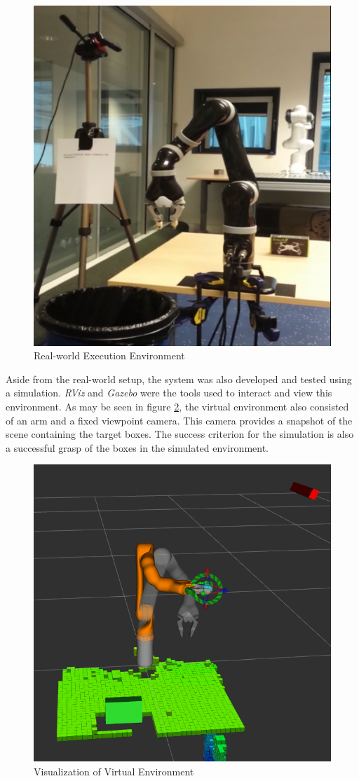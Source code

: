 \documentclass[letterpaper, 10 pt, conference]{conf/ieeeconf}  %
\begin{document}
\begin{figure}[H]
  \centering
  \includegraphics[width=0.8\linewidth]{real_environment.png}
  \caption{\label{fig:real_environment} Real-world Execution Environment}
\end{figure}

Aside from the real-world setup, the system was also developed and tested using
a simulation. \textit{RViz} and \textit{Gazebo} were the tools used to interact
and view this environment. As may be seen in figure
\ref{fig:virtual_environment}, the virtual environment also consisted of an arm
and a fixed viewpoint camera. This camera provides a snapshot of the scene
containing the target boxes. The success criterion for the simulation is also a
successful grasp of the boxes in the simulated environment.

\begin{figure}[H]
  \centering
  \includegraphics[width=0.8\linewidth]{virtual_environment.png}
  \caption{\label{fig:virtual_environment} Visualization of Virtual Environment}
\end{figure}
\end{document}
